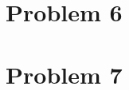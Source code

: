 \documentclass[11pt,letterpaper]{article}
\begin{document}
\section*{Problem 6} 

\begin{enumerate}[label=(\alph*)]
\end{enumerate}

\section*{Problem 7} 

\begin{enumerate}[label=(\alph*)]
\end{enumerate}
\end{document}
